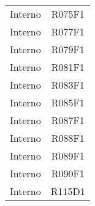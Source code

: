 \documentclass[../analisi-dei-requisiti.tex]{subfiles}
\begin{document}
\begin{longtable}[H]{c|c}
                                Interno & R075F1                               \\
                                Interno & R077F1                               \\
                                Interno & R079F1                               \\
                                Interno & R081F1                               \\
                                Interno & R083F1                               \\
                                Interno & R085F1                               \\
                                Interno & R087F1                               \\
                                Interno & R088F1                               \\
                                Interno & R089F1                               \\
                                Interno & R090F1                               \\
                                Interno & R115D1                               \\
\end{longtable}
\end{document}
